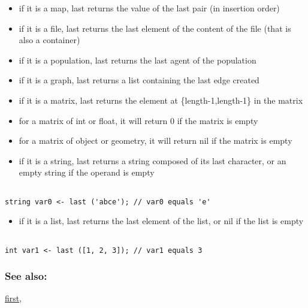 \documentclass[]{book}
\providecommand{\tightlist}{%
  \setlength{\itemsep}{0pt}\setlength{\parskip}{0pt}}
\theoremstyle{definition}
\theoremstyle{definition}
\theoremstyle{definition}
\theoremstyle{remark}
\begin{document}
\begin{itemize}
\tightlist
\item
  if it is a map, last returns the value of the last pair (in insertion
  order)\\
\item
  if it is a file, last returns the last element of the content of the
  file (that is also a container)\\
\item
  if it is a population, last returns the last agent of the population\\
\item
  if it is a graph, last returns a list containing the last edge
  created\\
\item
  if it is a matrix, last returns the element at \{length-1,length-1\}
  in the matrix\\
\item
  for a matrix of int or float, it will return 0 if the matrix is
  empty\\
\item
  for a matrix of object or geometry, it will return nil if the matrix
  is empty\\
\item
  if it is a string, last returns a string composed of its last
  character, or an empty string if the operand is empty
\end{itemize}

\begin{verbatim}
 
string var0 <- last ('abce'); // var0 equals 'e'
\end{verbatim}

\begin{itemize}
\tightlist
\item
  if it is a list, last returns the last element of the list, or nil if
  the list is empty
\end{itemize}

\begin{verbatim}
 
int var1 <- last ([1, 2, 3]); // var1 equals 3
\end{verbatim}

\subsubsection{See also:}\label{see-also-122}

\href{OperatorsDH\#first}{first},
\end{document}
